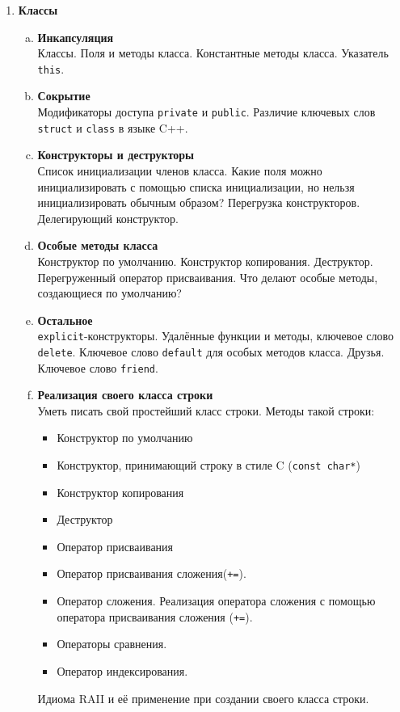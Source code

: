\documentclass{article}
\begin{document}
\begin{enumerate}
\item \textbf{Классы}

\begin{enumerate}[a.]
\item \textbf{Инкапсуляция}\\
Классы. Поля и методы класса. Константные методы класса. Указатель \texttt{this}.

\item \textbf{Сокрытие}\\
Модификаторы доступа \texttt{private} и \texttt{public}. Различие ключевых слов \texttt{struct} и \texttt{class} в языке C++.

\item \textbf{Конструкторы и деструкторы}\\
Список инициализации членов класса. Какие поля можно инициализировать с помощью списка инициализации, но нельзя инициализировать обычным образом? Перегрузка конструкторов. Делегирующий конструктор.

\item \textbf{Особые методы класса}\\
Конструктор по умолчанию. Конструктор копирования. Деструктор. Перегруженный оператор присваивания.
Что делают особые методы, создающиеся по умолчанию?

\item \textbf{Остальное}\\
\texttt{explicit}-конструкторы. Удалённые функции и методы, ключевое слово \texttt{delete}. Ключевое слово \texttt{default} для особых методов класса. Друзья. Ключевое слово \texttt{friend}.

\item \textbf{Реализация своего класса строки}\\
Уметь писать свой простейший класс строки.
Методы такой строки:
\begin{itemize}
\item Конструктор по умолчанию
\item Конструктор, принимающий строку в стиле C (\texttt{const char*})
\item Конструктор копирования
\item Деструктор
\item Оператор присваивания
\item Оператор присваивания сложения(\texttt{+=}). 
\item Оператор сложения. Реализация оператора сложения с помощью оператора присваивания сложения (\texttt{+=}).
\item Операторы сравнения.
\item Оператор индексирования.
\end{itemize}
Идиома RAII и её применение при создании своего класса строки.
\end{enumerate}






\end{enumerate}
\end{document}
